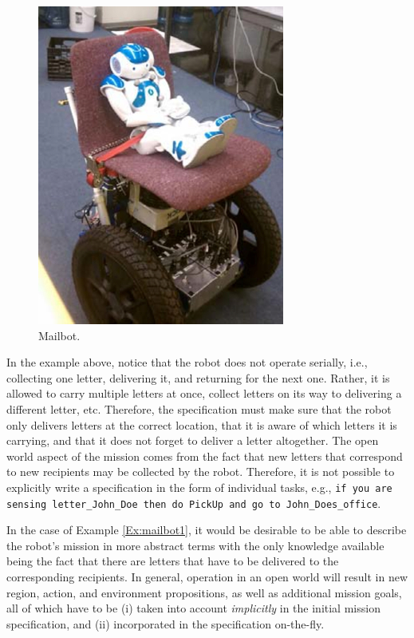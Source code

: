 \begin{figure}[ht]
	\centering
	\includegraphics[width=0.7\columnwidth, clip]{./img/pr3.jpg}
	\caption{Mailbot.}
	\label{Fig:pr3}
\end{figure}

In the example above, notice that the robot does not operate serially, i.e., collecting one letter, delivering it, and returning for the next one. Rather, it is allowed to carry multiple letters at once, collect letters on its way to delivering a different letter, etc. Therefore, the specification must make sure that the robot only delivers letters at the correct location, that it is aware of which letters it is carrying, and that it does not forget to deliver a letter altogether. The open world aspect of the mission comes from the fact that new letters that correspond to new recipients may be collected by the robot. Therefore, it is not possible to explicitly write a specification in the form of individual tasks, e.g., \texttt{if you are sensing letter\_John\_Doe then do PickUp and go to John\_Does\_office}.

In the case of Example \ref{Ex:mailbot1}, it would be desirable to be able to describe the robot's mission in more abstract terms with the only knowledge available being the fact that there are letters that have to be delivered to the corresponding recipients. In general, operation in an open world will result in new region, action, and environment propositions, as well as additional mission goals, all of which have to be (i) taken into account \emph{implicitly} in the initial mission specification, and (ii) incorporated in the specification on-the-fly.

